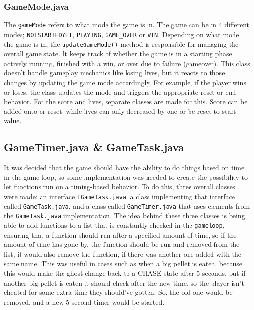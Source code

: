 \documentclass[a4paper,5pt]{article}
\begin{document}
\subsubsection{GameMode.java}
The \texttt{gameMode} refers to what mode the game is in. The game can be in 4 different modes; \texttt{NOTSTARTEDYET}, \texttt{PLAYING}, \texttt{GAME_OVER} or \texttt{WIN}. Depending on what mode the game is in, the \texttt{updateGameMode()} method is responsible for managing the overall game state. It keeps track of whether the game is in a starting phase, actively running, finished with a win, or over due to failure (gameover). This class doesn’t handle gameplay mechanics like losing lives, but it reacts to those changes by updating the game mode accordingly. For example, if the player wins or loses, the class updates the mode and triggers the appropriate reset or end behavior. For the score and lives, separate classes are made for this. Score can be added onto or reset, while lives can only decreased by one or be reset to start value.

\subsection{GameTimer.java \& GameTask.java}
It was decided that the game should have the ability to do things based on time in the game loop, so some implementation was needed to create the possibility to let functions run on a timing-based behavior. To do this, three overall classes were made: an interface \texttt{IGameTask.java}, a class implementing that interface called \texttt{GameTask.java}, and a class called \texttt{GameTimer.java} that uses elements from the \texttt{GameTask.java} implementation. The idea behind these three classes is being able to add functions to a list that is constantly checked in the \texttt{gameloop}, ensuring that a function should run after a specified amount of time, so if the amount of time has gone by, the function should be run and removed from the list, it would also remove the function, if there was another one added with the same name. This was useful in cases such as when a big pellet is eaten, because this would make the ghost change back to a CHASE state after 5 seconds, but if another big pellet is eaten it should check after the new time, so the player isn’t cheated for some extra time they should’ve gotten. So, the old one would be removed, and a new 5 second timer would be started.
\end{document}
